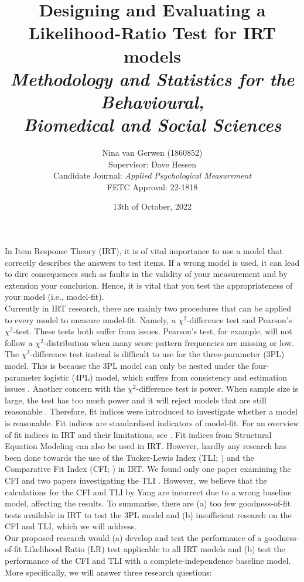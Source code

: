 \documentclass{article}
\title{%
	Designing and Evaluating a Likelihood-Ratio Test for IRT models \\
	\large \textit{Methodology and Statistics for the Behavioural, \\
	Biomedical and Social Sciences}}
\author{Nina van Gerwen (1860852) \\ 
	Supervisor: Dave Hessen \\ 
	\small {Candidate Journal: \textit{Applied Psychological Measurement}} \\
	\small {FETC Approval: 22-1818}}
\date{13th of October, 2022}
\begin{document}
\maketitle

\newpage

\section{}
\indent In Item Response Theory (IRT), it is of vital importance to use a model that correctly describes the answers to test items. If a wrong model is used, it can lead to dire consequences such as faults in the validity of your measurement \autocite{consq1, consq2, consq3} and by extension your conclusion. Hence, it is vital that you test the appropriateness of your model (i.e., model-fit). \\
\indent Currently in IRT research, there are mainly two procedures that can be applied to every model to measure model-fit. Namely, a $\chi^2$-difference test and Pearson's $\chi^2$-test. These tests both suffer from issues. Pearson's test, for example, will not follow a $\chi^2$-distribution when many score pattern frequencies are missing or low. The $\chi^2$-difference test instead is difficult to use for the three-parameter (3PL) model. This is because the 3PL model can only be nested under the four-parameter logistic (4PL) model, which suffers from consistency and estimation issues \autocite{4plconsist1, 4plconsist2}. Another concern with the $\chi^2$-difference test is power. When sample size is large, the test has too much power and it will reject models that are still reasonable \autocite{chi2sens}. Therefore, fit indices were introduced to investigate whether a model is reasonable. Fit indices are standardised indicators of model-fit. For an overview of fit indices in IRT and their limitations, see \textcite{ref1}. Fit indices from Structural Equation Modeling can also be used in IRT. However, hardly any research has been done towards the use of the Tucker-Lewis Index (TLI; \cite{tli}) and the Comparative Fit Index (CFI; \cite{cfi}) in IRT. We found only one paper examining the CFI \autocite{yangfitindex} and two papers investigating the TLI \autocite{yangfitindex, tliirt}. However, we believe that the calculations for the CFI and TLI by Yang are incorrect due to a wrong baseline model, affecting the results. To summarise, there are (a) too few goodness-of-fit tests available in IRT to test the 3PL model and (b) insufficient research on the CFI and TLI, which we will address. \\
\indent Our proposed research would (a) develop and test the performance of a goodness-of-fit Likelihood Ratio (LR) test applicable to all IRT models and (b) test the performance of the CFI and TLI with a complete-independence baseline model. More specifically, we will answer three research questions:
\end{document}
